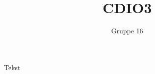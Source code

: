 \documentclass[12pt,a4paper]{paper}
\author{Gruppe 16}
\title{CDIO3}
\begin{document}
        
        \pagebreak
        \pagebreak
    Tekst
    
\end{document}
